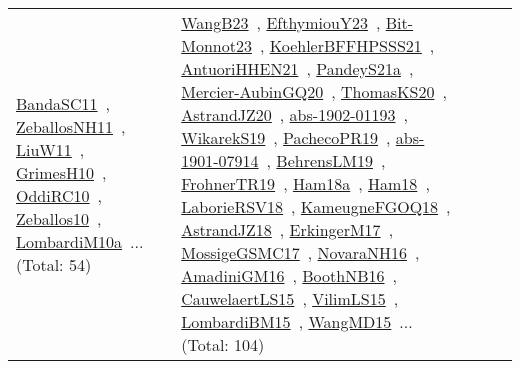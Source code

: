 {\begin{longtable}{lp{3cm}>{\raggedright\arraybackslash}p{6cm}>{\raggedright\arraybackslash}p{6cm}>{\raggedright\arraybackslash}p{8cm}}
\href{../works/BandaSC11.pdf}{BandaSC11}~\cite{BandaSC11}, \href{../works/ZeballosNH11.pdf}{ZeballosNH11}~\cite{ZeballosNH11}, \href{../works/LiuW11.pdf}{LiuW11}~\cite{LiuW11}, \href{../works/GrimesH10.pdf}{GrimesH10}~\cite{GrimesH10}, \href{../works/OddiRC10.pdf}{OddiRC10}~\cite{OddiRC10}, \href{../works/Zeballos10.pdf}{Zeballos10}~\cite{Zeballos10}, \href{../works/LombardiM10a.pdf}{LombardiM10a}~\cite{LombardiM10a}... (Total: 54) & \href{../works/WangB23.pdf}{WangB23}~\cite{WangB23}, \href{../works/EfthymiouY23.pdf}{EfthymiouY23}~\cite{EfthymiouY23}, \href{../works/Bit-Monnot23.pdf}{Bit-Monnot23}~\cite{Bit-Monnot23}, \href{../works/KoehlerBFFHPSSS21.pdf}{KoehlerBFFHPSSS21}~\cite{KoehlerBFFHPSSS21}, \href{../works/AntuoriHHEN21.pdf}{AntuoriHHEN21}~\cite{AntuoriHHEN21}, \href{../works/PandeyS21a.pdf}{PandeyS21a}~\cite{PandeyS21a}, \href{../works/Mercier-AubinGQ20.pdf}{Mercier-AubinGQ20}~\cite{Mercier-AubinGQ20}, \href{../works/ThomasKS20.pdf}{ThomasKS20}~\cite{ThomasKS20}, \href{../works/AstrandJZ20.pdf}{AstrandJZ20}~\cite{AstrandJZ20}, \href{../works/abs-1902-01193.pdf}{abs-1902-01193}~\cite{abs-1902-01193}, \href{../works/WikarekS19.pdf}{WikarekS19}~\cite{WikarekS19}, \href{../works/PachecoPR19.pdf}{PachecoPR19}~\cite{PachecoPR19}, \href{../works/abs-1901-07914.pdf}{abs-1901-07914}~\cite{abs-1901-07914}, \href{../works/BehrensLM19.pdf}{BehrensLM19}~\cite{BehrensLM19}, \href{../works/FrohnerTR19.pdf}{FrohnerTR19}~\cite{FrohnerTR19}, \href{../works/Ham18a.pdf}{Ham18a}~\cite{Ham18a}, \href{../works/Ham18.pdf}{Ham18}~\cite{Ham18}, \href{../works/LaborieRSV18.pdf}{LaborieRSV18}~\cite{LaborieRSV18}, \href{../works/KameugneFGOQ18.pdf}{KameugneFGOQ18}~\cite{KameugneFGOQ18}, \href{../works/AstrandJZ18.pdf}{AstrandJZ18}~\cite{AstrandJZ18}, \href{../works/ErkingerM17.pdf}{ErkingerM17}~\cite{ErkingerM17}, \href{../works/MossigeGSMC17.pdf}{MossigeGSMC17}~\cite{MossigeGSMC17}, \href{../works/NovaraNH16.pdf}{NovaraNH16}~\cite{NovaraNH16}, \href{../works/AmadiniGM16.pdf}{AmadiniGM16}~\cite{AmadiniGM16}, \href{../works/BoothNB16.pdf}{BoothNB16}~\cite{BoothNB16}, \href{../works/CauwelaertLS15.pdf}{CauwelaertLS15}~\cite{CauwelaertLS15}, \href{../works/VilimLS15.pdf}{VilimLS15}~\cite{VilimLS15}, \href{../works/LombardiBM15.pdf}{LombardiBM15}~\cite{LombardiBM15}, \href{../works/WangMD15.pdf}{WangMD15}~\cite{WangMD15}... (Total: 104)\\

\end{longtable}}
